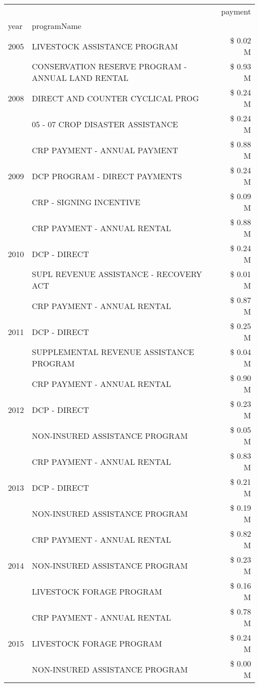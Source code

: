 \begin{tabular}{llr}
\toprule
 &  & payment \\
year & programName &  \\
\midrule
2005 & LIVESTOCK ASSISTANCE PROGRAM & \$ 0.02 M \\
\cline{1-3}
\multirow[t]{3}{*}{2008} & CONSERVATION RESERVE PROGRAM - ANNUAL LAND RENTAL & \$ 0.93 M \\
 & DIRECT AND COUNTER CYCLICAL PROG & \$ 0.24 M \\
 & 05 - 07 CROP DISASTER ASSISTANCE & \$ 0.24 M \\
\cline{1-3}
\multirow[t]{3}{*}{2009} & CRP PAYMENT - ANNUAL PAYMENT & \$ 0.88 M \\
 & DCP PROGRAM - DIRECT PAYMENTS & \$ 0.24 M \\
 & CRP - SIGNING INCENTIVE & \$ 0.09 M \\
\cline{1-3}
\multirow[t]{3}{*}{2010} & CRP PAYMENT - ANNUAL RENTAL & \$ 0.88 M \\
 & DCP - DIRECT & \$ 0.24 M \\
 & SUPL REVENUE ASSISTANCE - RECOVERY ACT & \$ 0.01 M \\
\cline{1-3}
\multirow[t]{3}{*}{2011} & CRP PAYMENT - ANNUAL RENTAL & \$ 0.87 M \\
 & DCP - DIRECT & \$ 0.25 M \\
 & SUPPLEMENTAL REVENUE ASSISTANCE PROGRAM & \$ 0.04 M \\
\cline{1-3}
\multirow[t]{3}{*}{2012} & CRP PAYMENT - ANNUAL RENTAL & \$ 0.90 M \\
 & DCP - DIRECT & \$ 0.23 M \\
 & NON-INSURED ASSISTANCE PROGRAM & \$ 0.05 M \\
\cline{1-3}
\multirow[t]{3}{*}{2013} & CRP PAYMENT - ANNUAL RENTAL & \$ 0.83 M \\
 & DCP - DIRECT & \$ 0.21 M \\
 & NON-INSURED ASSISTANCE PROGRAM & \$ 0.19 M \\
\cline{1-3}
\multirow[t]{3}{*}{2014} & CRP PAYMENT - ANNUAL RENTAL & \$ 0.82 M \\
 & NON-INSURED ASSISTANCE PROGRAM & \$ 0.23 M \\
 & LIVESTOCK FORAGE PROGRAM & \$ 0.16 M \\
\cline{1-3}
\multirow[t]{3}{*}{2015} & CRP PAYMENT - ANNUAL RENTAL & \$ 0.78 M \\
 & LIVESTOCK FORAGE PROGRAM & \$ 0.24 M \\
 & NON-INSURED ASSISTANCE PROGRAM & \$ 0.00 M \\

\end{tabular}
